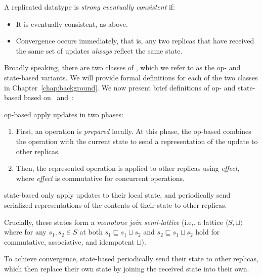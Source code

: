 \begin{definition}
  A replicated datatype is \emph{strong eventually consistent} if:
  \begin{itemize}
    \item It is eventually consistent, as above.
    \item Convergence occurs immediately, that is, any two replicas that have
      received the same set of updates \emph{always} reflect the same state.
  \end{itemize}
\end{definition}

Broadly speaking, there are two classes of \CRDTs, which we refer to as the op-
and state-based variants. We will provide formal definitions for each of the two
classes in Chapter~\ref{chap:background}. We now present brief definitions of
op- and state-based \CRDTs based on~\citet{baquero14} and~\citet{shapiro11}:

\begin{definition}
  op-based \CRDTs apply updates in two phases:
  \begin{enumerate}
    \item First, an operation is \emph{prepared} locally. At this phase, the
      op-based \CRDT combines the operation with the current state to send a
      representation of the update to other replicas.
    \item Then, the represented operation is applied to other replicas using
      \emph{effect}, where \emph{effect} is commutative for concurrent
      operations.
  \end{enumerate}
\end{definition}

\begin{definition}
  state-based \CRDTs only apply updates to their local state, and periodically
  send serialized representations of the contents of their state to other
  replicas.

  Crucially, these states form a \textit{monotone join semi-lattice} (i.e,. a
  lattice $\langle S, \sqcup \rangle$ where for any $s_1, s_2 \in S$ at both
  $s_1 \sqsubseteq s_1 \sqcup s_2$ and $s_2 \sqsubseteq s_1 \sqcup s_2$ hold for
  commutative, associative, and idempotent $\sqcup$).

  To achieve convergence, state-based \CRDTs periodically send their state to
  other replicas, which then replace their own state by joining the received
  state into their own.
\end{definition}


